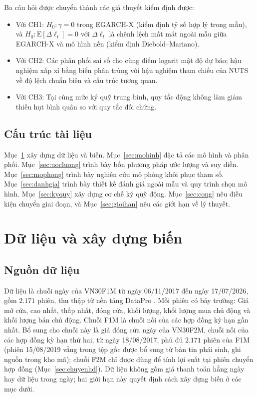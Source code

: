 \documentclass[12pt,a4paper]{article}
\theoremstyle{definition}
\theoremstyle{remark}
\newcommand{\E}{\mathrm{E}}
\begin{document}
Ba câu hỏi được chuyển thành các giả thuyết kiểm định được:
\begin{itemize}
\item Với CH1: $H_0:\gamma=0$ trong EGARCH-X (kiểm định tỷ số hợp lý trong mẫu), và $H_0:\E[\Delta\ell_t]=0$ với $\Delta\ell_t$ là chênh lệch mất mát ngoài mẫu giữa EGARCH-X và mô hình nền (kiểm định Diebold--Mariano).
\item Với CH2: Các phân phối sai số cho cùng điểm logarit mật độ dự báo; hậu nghiệm xấp xỉ bằng biến phân trùng với hậu nghiệm tham chiếu của NUTS về độ lệch chuẩn biên và cấu trúc tương quan.
\item Với CH3: Tại cùng mức ký quỹ trung bình, quy tắc động không làm giảm thiếu hụt bình quân so với quy tắc đối chứng.
\end{itemize}

\subsection{Cấu trúc tài liệu}

Mục~\ref{sec:dulieu} xây dựng dữ liệu và biến. Mục~\ref{sec:mohinh} đặc tả các mô hình và phân phối. Mục~\ref{sec:uocluong} trình bày bốn phương pháp ước lượng và suy diễn. Mục~\ref{sec:mophong} trình bày nghiên cứu mô phỏng khôi phục tham số. Mục~\ref{sec:danhgia} trình bày thiết kế đánh giá ngoài mẫu và quy trình chọn mô hình. Mục~\ref{sec:kyquy} xây dựng cơ chế ký quỹ động. Mục~\ref{sec:cong} nêu điều kiện chuyển giai đoạn, và Mục~\ref{sec:gioihan} nêu các giới hạn về lý thuyết.

\section{Dữ liệu và xây dựng biến}\label{sec:dulieu}

\subsection{Nguồn dữ liệu}

Dữ liệu là chuỗi ngày của VN30F1M từ ngày 06/11/2017 đến ngày 17/07/2026, gồm $2.171$ phiên, thu thập từ nền tảng DataPro \cite{datapro}. Mỗi phiên có bảy trường: Giá mở cửa, cao nhất, thấp nhất, đóng cửa, khối lượng, khối lượng mua chủ động và khối lượng bán chủ động. Chuỗi F1M là chuỗi nối của các hợp đồng kỳ hạn gần nhất. Bổ sung cho chuỗi này là giá đóng cửa ngày của VN30F2M, chuỗi nối của các hợp đồng kỳ hạn thứ hai, từ ngày 18/08/2017, phủ đủ $2.171$ phiên của F1M (phiên 15/08/2019 vắng trong tệp gốc được bổ sung từ bản tin phái sinh, ghi nguồn trong kho mã); chuỗi F2M chỉ được dùng để tính lợi suất tại phiên chuyển hợp đồng (Mục~\ref{sec:chuyenhd}). Dữ liệu không gồm giá thanh toán hằng ngày hay dữ liệu trong ngày; hai giới hạn này quyết định cách xây dựng biến ở các mục dưới.
\end{document}
